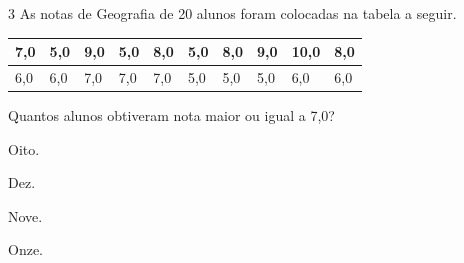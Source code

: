 





\num{3} As notas de Geografia de 20 alunos foram colocadas na tabela a seguir.


\begin{longtable}[]{@{}llllllllll@{}}
\toprule
7,0 & 5,0 & 9,0 & 5,0 & 8,0 & 5,0 & 8,0 & 9,0 & 10,0 &
8,0\tabularnewline
\midrule
\endhead
6,0 & 6,0 & 7,0 & 7,0 & 7,0 & 5,0 & 5,0 & 5,0 & 6,0 & 6,0\tabularnewline
\bottomrule
\end{longtable}

Quantos alunos obtiveram nota maior ou igual a 7,0?

\begin{escolha}
\item Oito.
\item Dez.
\item Nove.
\item Onze.
\end{escolha}




